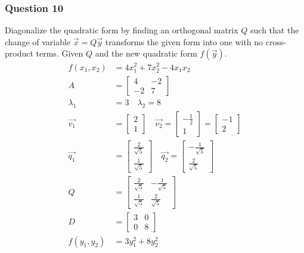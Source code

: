 \documentclass{math}
\begin{document}
\subsubsection*{Question 10}
Diagonalize the quadratic form by finding an orthogonal matrix \( Q \) such that
the change of variable \( \vec{x} = Q\vec{y} \) transforms the given form into
one with no cross-product terms. Given \( Q \) and the new quadratic form
\( f(\vec{y}) \).
\begin{align*}
  f(x_1,x_2) &= 4x_1^2+7x_2^2-4x_1x_2 \\
  A &= \begin{bmatrix}4 & -2 \\ - 2 & 7\end{bmatrix} \\
  \lambda_1 &= 3 \quad \lambda_2 = 8 \\
  \vec{v_1} &= \begin{bmatrix}2 \\ 1\end{bmatrix} \quad
    \vec{v_2} = \begin{bmatrix}-\frac{1}{2} \\ 1\end{bmatrix} =
      \begin{bmatrix}-1 \\ 2\end{bmatrix} \\
  \vec{q_1} &= \begin{bmatrix}
    \frac{2}{\sqrt{5}} \\ \frac{1}{\sqrt{5}}
  \end{bmatrix} \quad \vec{q_2} = \begin{bmatrix}
    -\frac{1}{\sqrt{5}} \\ \frac{2}{\sqrt{5}}
  \end{bmatrix} \\
  Q &= \begin{bmatrix}
    \frac{2}{\sqrt{5}} & -\frac{1}{\sqrt{5}} \\
    \frac{1}{\sqrt{5}} & \frac{2}{\sqrt{5}}
  \end{bmatrix} \\
  D &= \begin{bmatrix}3 & 0 \\ 0 & 8\end{bmatrix} \\
  f(y_1,y_2) &= 3y_1^2+8y_2^2
\end{align*}
\end{document}
